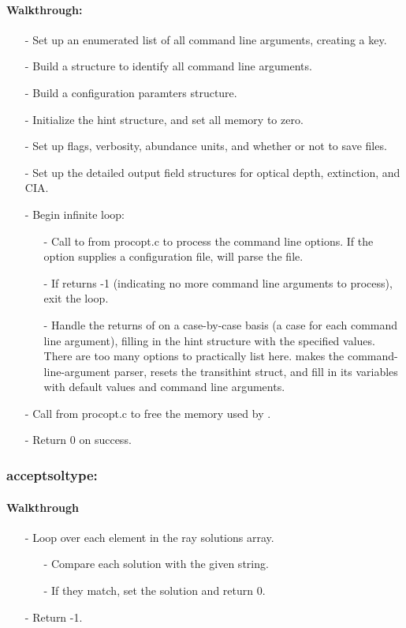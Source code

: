 \documentclass[letterpaper,12pt]{article}
\begin{document}
\paragraph{Walkthrough:}
\begin{enumerate}[leftmargin=10pt, noitemsep, parsep=0pt, topsep=0ex]
\item[-] Set up an enumerated list of all command line arguments, creating a key.
\item[-] Build a structure to identify all command line arguments.
\item[-] Build a configuration paramters structure.
\item[-] Initialize the hint structure, and set all memory to zero.
\item[-] Set up flags, verbosity, abundance units, and whether or not to save files.
\item[-] Set up the detailed output field structures for optical depth, extinction, and CIA.
\item[-] Begin infinite loop:
\begin{enumerate}[leftmargin=10pt, noitemsep, parsep=0pt, topsep=0ex]
\item[-] Call to  from procopt.c to process the command line options. If the option supplies a configuration file,  will parse the file.
\item[-] If  returns -1 (indicating no more command line arguments to process), exit the loop.
\item[-] Handle the returns of  on a case-by-case basis (a case for each command line argument), filling in the hint structure with the specified values. There are too many options to practically list here.
makes the command-line-argument parser, resets the transithint struct, and fill in its variables with default values and command line arguments. 
\end{enumerate} 
\item[-] Call  from procopt.c to free the memory used by .
\item[-] Return 0 on success.
\end{enumerate}

\subsubsection{acceptsoltype:}
\paragraph{Walkthrough}
\begin{enumerate}[leftmargin=10pt, noitemsep, parsep=0pt, topsep=0ex]
\item[-] Loop over each element in the ray solutions array.
\begin{enumerate}[leftmargin=10pt, noitemsep, parsep=0pt, topsep=0ex]
\item[-] Compare each solution with the given string.
\item[-] If they match, set the solution and return 0.
\end{enumerate}
\item[-] Return -1.
\end{enumerate}
\end{document}
